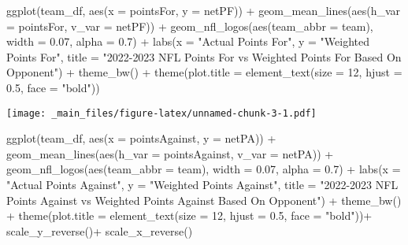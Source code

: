 \documentclass[
]{article}
\newenvironment{Shaded}{\begin{snugshade}}{\end{snugshade}}
\newcommand{\AttributeTok}[1]{\textcolor[rgb]{0.77,0.63,0.00}{#1}}
\newcommand{\DecValTok}[1]{\textcolor[rgb]{0.00,0.00,0.81}{#1}}
\newcommand{\FloatTok}[1]{\textcolor[rgb]{0.00,0.00,0.81}{#1}}
\newcommand{\FunctionTok}[1]{\textcolor[rgb]{0.00,0.00,0.00}{#1}}
\newcommand{\NormalTok}[1]{#1}
\newcommand{\SpecialCharTok}[1]{\textcolor[rgb]{0.00,0.00,0.00}{#1}}
\newcommand{\StringTok}[1]{\textcolor[rgb]{0.31,0.60,0.02}{#1}}
\begin{document}
\begin{Shaded}
\begin{Highlighting}[]
\FunctionTok{ggplot}\NormalTok{(team\_df, }\FunctionTok{aes}\NormalTok{(}\AttributeTok{x =}\NormalTok{ pointsFor, }\AttributeTok{y =}\NormalTok{ netPF)) }\SpecialCharTok{+}
  \FunctionTok{geom\_mean\_lines}\NormalTok{(}\FunctionTok{aes}\NormalTok{(}\AttributeTok{h\_var =}\NormalTok{ pointsFor, }\AttributeTok{v\_var =}\NormalTok{ netPF)) }\SpecialCharTok{+}
  \FunctionTok{geom\_nfl\_logos}\NormalTok{(}\FunctionTok{aes}\NormalTok{(}\AttributeTok{team\_abbr =}\NormalTok{ team), }\AttributeTok{width =} \FloatTok{0.07}\NormalTok{, }\AttributeTok{alpha =} \FloatTok{0.7}\NormalTok{) }\SpecialCharTok{+}
  \FunctionTok{labs}\NormalTok{(}\AttributeTok{x =} \StringTok{"Actual Points For"}\NormalTok{,}
       \AttributeTok{y =} \StringTok{"Weighted Points For"}\NormalTok{,}
       \AttributeTok{title =} \StringTok{"2022{-}2023 NFL Points For vs Weighted Points For Based On Opponent"}\NormalTok{) }\SpecialCharTok{+}
  \FunctionTok{theme\_bw}\NormalTok{() }\SpecialCharTok{+}
  \FunctionTok{theme}\NormalTok{(}\AttributeTok{plot.title =} \FunctionTok{element\_text}\NormalTok{(}\AttributeTok{size =} \DecValTok{12}\NormalTok{, }\AttributeTok{hjust =} \FloatTok{0.5}\NormalTok{, }\AttributeTok{face =} \StringTok{"bold"}\NormalTok{))}
\end{Highlighting}
\end{Shaded}

\texttt{[image: \_main\_files/figure-latex/unnamed-chunk-3-1.pdf]}

\begin{Shaded}
\begin{Highlighting}[]
\FunctionTok{ggplot}\NormalTok{(team\_df, }\FunctionTok{aes}\NormalTok{(}\AttributeTok{x =}\NormalTok{ pointsAgainst, }\AttributeTok{y =}\NormalTok{ netPA)) }\SpecialCharTok{+}
  \FunctionTok{geom\_mean\_lines}\NormalTok{(}\FunctionTok{aes}\NormalTok{(}\AttributeTok{h\_var =}\NormalTok{ pointsAgainst, }\AttributeTok{v\_var =}\NormalTok{ netPA)) }\SpecialCharTok{+}
  \FunctionTok{geom\_nfl\_logos}\NormalTok{(}\FunctionTok{aes}\NormalTok{(}\AttributeTok{team\_abbr =}\NormalTok{ team), }\AttributeTok{width =} \FloatTok{0.07}\NormalTok{, }\AttributeTok{alpha =} \FloatTok{0.7}\NormalTok{) }\SpecialCharTok{+}
  \FunctionTok{labs}\NormalTok{(}\AttributeTok{x =} \StringTok{"Actual Points Against"}\NormalTok{,}
       \AttributeTok{y =} \StringTok{"Weighted Points Against"}\NormalTok{,}
       \AttributeTok{title =} \StringTok{"2022{-}2023 NFL Points Against vs Weighted Points Against Based On Opponent"}\NormalTok{) }\SpecialCharTok{+}
  \FunctionTok{theme\_bw}\NormalTok{() }\SpecialCharTok{+}
  \FunctionTok{theme}\NormalTok{(}\AttributeTok{plot.title =} \FunctionTok{element\_text}\NormalTok{(}\AttributeTok{size =} \DecValTok{12}\NormalTok{, }\AttributeTok{hjust =} \FloatTok{0.5}\NormalTok{, }\AttributeTok{face =} \StringTok{"bold"}\NormalTok{))}\SpecialCharTok{+}
  \FunctionTok{scale\_y\_reverse}\NormalTok{()}\SpecialCharTok{+}
  \FunctionTok{scale\_x\_reverse}\NormalTok{()}
\end{Highlighting}
\end{Shaded}
\end{document}
